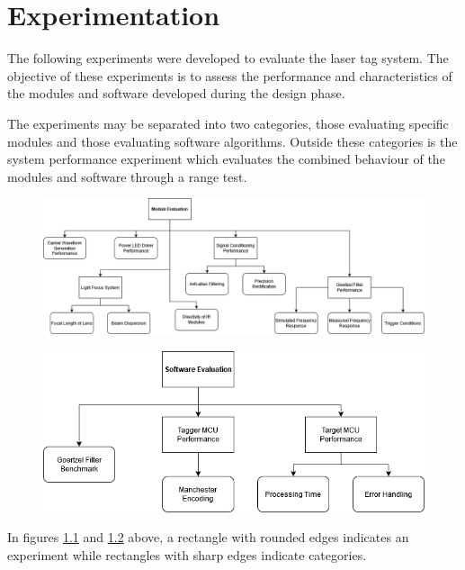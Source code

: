 \chapter{Experimentation}
\label{ch_experimentation}
The following experiments were developed to evaluate the laser tag system. The objective of these experiments is to assess the performance and characteristics of the modules and software developed during the design phase.

The experiments may be separated into two categories, those evaluating specific modules and those evaluating software algorithms. Outside these categories is the system performance experiment which evaluates the combined behaviour of the modules and software through a range test.

\begin{figure}[H]
	\centering
	\includegraphics[width=\linewidth]{figures/experimentation/experiments_overview_module_evaluation.png}
	\label{fig:experiments_overview_module_evaluation}
\end{figure}

\begin{figure}[H]
	\centering
	\includegraphics[width=.7\linewidth]{figures/experimentation/experiments_overview_software_evaluation.png}
	\label{fig:experiments_overview_software_evaluation}
\end{figure}

In figures \ref{fig:experiments_overview_module_evaluation} and \ref{fig:experiments_overview_software_evaluation} above, a rectangle with rounded edges indicates an experiment while rectangles with sharp edges indicate categories.




